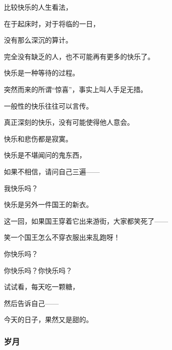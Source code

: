 \par 比较快乐的人生看法，
\par 在于起床时，对于将临的一日，
\par 没有那么深沉的算计。
\par 
\par 完全没有缺乏的人，也不可能再有更多的快乐了。
\par 
\par 快乐是一种等待的过程。
\par 突然而来的所谓“惊喜”，事实上叫人手足无措。
\par 
\par 一般性的快乐往往可以言传。
\par 真正深刻的快乐，没有可能使得他人意会。
\par 快乐和悲伤都是寂寞。
\par 
\par 快乐是不堪闻问的鬼东西，
\par 如果不相信，请问自己三遍——
\par 我快乐吗？
\par 
\par 快乐是另外一件国王的新衣。
\par 这一回，如果国王穿着它出来游街，大家都笑死了——
\par 笑一个国王怎么不穿衣服出来乱跑呀！
\par 
\par 你快乐吗？
\par 你快乐吗？你快乐吗？
\par 
\par 试试看，每天吃一颗糖，
\par 然后告诉自己——
\par 今天的日子，果然又是甜的。


\subsubsection{岁月}

